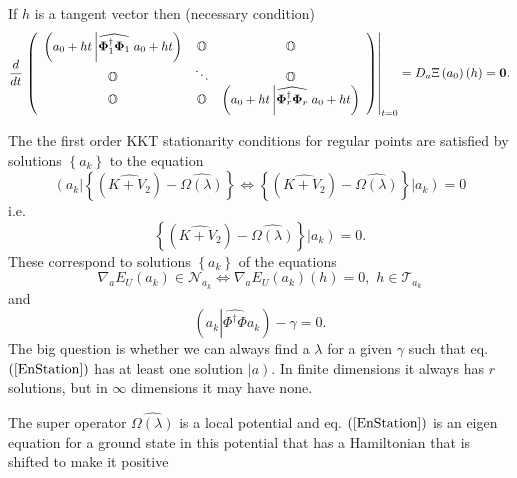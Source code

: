 \documentclass[aps,preprint]{revtex4}%
\begin{document}
If $h$ is a tangent vector then (necessary condition)
\begin{equation}
\frac{d}{dt}\left.  \left(
\begin{array}
[c]{ccc}%
\left(  a_{0}+ht\left\vert \widehat{\mathbf{\Phi}_{1}^{\dagger}\mathbf{\Phi
}_{1}}\right.  a_{0}+ht\right)  & \mathbb{O} & \mathbb{O}\\
\mathbb{O} & \ddots & \mathbb{O}\\
\mathbb{O} & \mathbb{O} & \left(  a_{0}+ht\left\vert \widehat{\mathbf{\Phi
}_{r}^{\dagger}\mathbf{\Phi}_{r}}\right.  a_{0}+ht\right)
\end{array}
\right)  \right\vert _{t=0}=D_{a}\Xi\left(  a_{0}\right)  \left(  h\right)
=\mathbf{0.}%
\end{equation}


The the first order KKT stationarity conditions for regular points are
satisfied by solutions $\left\{  a_{k}\right\}  $ to the equation
\begin{equation}
\left(  \overset{}{a_{k}}\right\vert \left\{  \left(  \widehat{K+V_{2}%
}\right)  -\widehat{\Omega\left(  \lambda\right)  }\right\}  \Leftrightarrow
\left\{  \left(  \widehat{K+V_{2}}\right)  -\widehat{\Omega\left(
\lambda\right)  }\right\}  \left\vert \overset{}{a_{k}}\right)  =0
\label{EnStation}%
\end{equation}
i.e.
\begin{equation}
\left\{  \left(  \widehat{K+V_{2}}\right)  -\widehat{\Omega\left(
\lambda\right)  }\right\}  \left\vert \overset{}{a_{k}}\right)  =0.
\end{equation}
These correspond to solutions $\left\{  a_{k}\right\}  $ of the equations
\begin{equation}
\nabla_{a}E_{U}\left(  a_{k}\right)  \in\mathcal{N}_{a_{k}}\Leftrightarrow
\nabla_{a}E_{U}\left(  a_{k}\right)  \left(  h\right)  =0,\,\,h\in
\mathcal{T}_{a_{k}}%
\end{equation}
and
\begin{equation}
\left(  a_{k}\left\vert \widehat{\Phi^{\dagger}\Phi}\right.  a_{k}\right)
-\gamma=0. \label{surface}%
\end{equation}
The big question is whether we can always find a $\lambda$ for a given
$\gamma$ such that eq. $\left(  \ref{EnStation}\right)  $ has at least one
solution $\left\vert \overset{}{a}\right)  .$ In finite dimensions it always
has $r$ solutions, but in $\infty$ dimensions it may have none.

The super operator $\widehat{\Omega\left(  \lambda\right)  }$ is a local
potential and eq. $\left(  \ref{EnStation}\right)  $ is an eigen equation for
a ground state in this potential that has a Hamiltonian that is shifted to
make it positive
\end{document}

